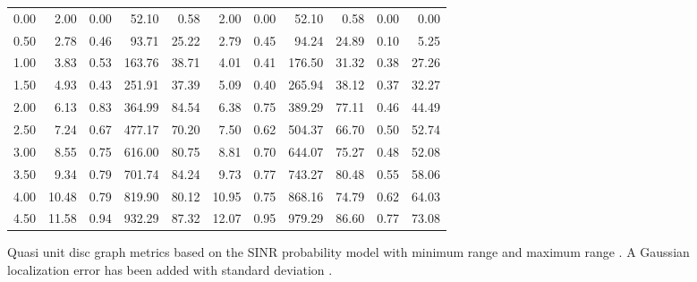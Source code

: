 \documentclass{article}
\begin{document}
\begin{figure}[h]
\begin{center}
\begin{tabular}{|r|rr|rr|rr|rr|rr|}
0.00 &  2.00 & 0.00 &  52.10 &  0.58 &  2.00 & 0.00 &  52.10 &  0.58 & 0.00 & 0.00\\
0.50 &  2.78 & 0.46 &  93.71 & 25.22 &  2.79 & 0.45 &  94.24 & 24.89 & 0.10 & 5.25\\
1.00 &  3.83 & 0.53 & 163.76 & 38.71 &  4.01 & 0.41 & 176.50 & 31.32 & 0.38 & 27.26\\
1.50 &  4.93 & 0.43 & 251.91 & 37.39 &  5.09 & 0.40 & 265.94 & 38.12 & 0.37 & 32.27\\
2.00 &  6.13 & 0.83 & 364.99 & 84.54 &  6.38 & 0.75 & 389.29 & 77.11 & 0.46 & 44.49\\
2.50 &  7.24 & 0.67 & 477.17 & 70.20 &  7.50 & 0.62 & 504.37 & 66.70 & 0.50 & 52.74\\
3.00 &  8.55 & 0.75 & 616.00 & 80.75 &  8.81 & 0.70 & 644.07 & 75.27 & 0.48 & 52.08\\
3.50 &  9.34 & 0.79 & 701.74 & 84.24 &  9.73 & 0.77 & 743.27 & 80.48 & 0.55 & 58.06\\
4.00 & 10.48 & 0.79 & 819.90 & 80.12 & 10.95 & 0.75 & 868.16 & 74.79 & 0.62 & 64.03\\
4.50 & 11.58 & 0.94 & 932.29 & 87.32 & 12.07 & 0.95 & 979.29 & 86.60 & 0.77 & 73.08\\
\hline
\end{tabular}
\caption{Quasi unit disc graph metrics based on the SINR probability model with minimum range  and maximum range . A Gaussian localization error has been added with standard deviation .}
\label{exp_quasi_e}
\end{center}
\end{figure}
\end{document}
